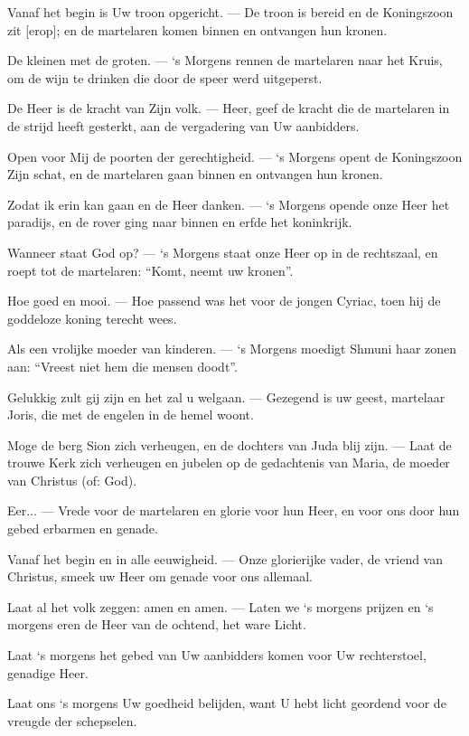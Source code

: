 \documentclass[12pt,twoside,a5paper]{article}
\newlength{\origparskip}
\newenvironment{halfparskip}{
  \setlength{\parskip}{0.5\origparskip}
}{
  \setlength{\parskip}{\origparskip}
}
\begin{document}
\begin{halfparskip}
  Vanaf het begin is Uw troon opgericht. --- De troon is bereid en de Koningszoon zit [erop]; en de martelaren komen binnen en ontvangen hun kronen.

  De kleinen met de groten. --- `s Morgens rennen de martelaren naar het Kruis, om de wijn te drinken die door de speer werd uitgeperst.

  De Heer is de kracht van Zijn volk. --- Heer, geef de kracht die de martelaren in de strijd heeft gesterkt, aan de vergadering van Uw aanbidders.

  Open voor Mij de poorten der gerechtigheid. --- `s Morgens opent de Koningszoon Zijn schat, en de martelaren gaan binnen en ontvangen hun kronen.

  Zodat ik erin kan gaan en de Heer danken. --- `s Morgens opende onze Heer het paradijs, en de rover ging naar binnen en erfde het koninkrijk.

  Wanneer staat God op? --- `s Morgens staat onze Heer op in de rechtszaal, en roept tot de martelaren: ``Komt, neemt uw kronen''.

  Hoe goed en mooi. --- Hoe passend was het voor de jongen Cyriac, toen hij de goddeloze koning terecht wees.

  Als een vrolijke moeder van kinderen. --- `s Morgens moedigt Shmuni haar zonen aan: ``Vreest niet hem die mensen doodt''.

  Gelukkig zult gij zijn en het zal u welgaan. --- Gezegend is uw geest, martelaar Joris, die met de engelen in de hemel woont.

  Moge de berg Sion zich verheugen, en de dochters van Juda blij zijn. --- Laat de trouwe Kerk zich verheugen en jubelen op de gedachtenis van Maria, de moeder van Christus (of: God).

  Eer... --- Vrede voor de martelaren en glorie voor hun Heer, en voor ons door hun gebed erbarmen en genade.

  Vanaf het begin en in alle eeuwigheid. --- Onze glorierijke vader, de vriend van Christus, smeek uw Heer om genade voor ons allemaal.

  Laat al het volk zeggen: amen en amen. --- Laten we `s morgens prijzen en `s morgens eren de Heer van de ochtend, het ware Licht.

  Laat `s morgens het gebed van Uw aanbidders komen voor Uw rechterstoel, genadige Heer.

  Laat ons `s morgens Uw goedheid belijden, want U hebt licht geordend voor de vreugde der schepselen.
\end{halfparskip}
\end{document}
